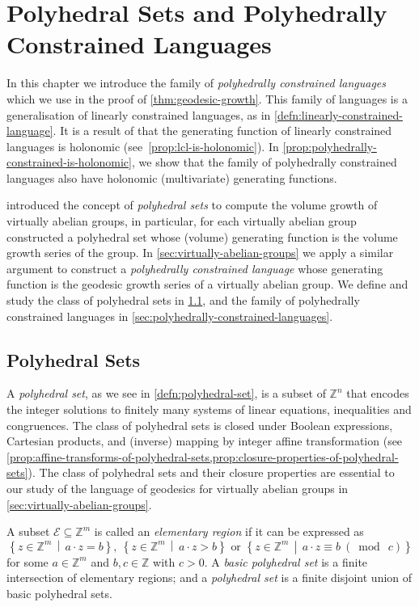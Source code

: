 \chapter{Polyhedral Sets and Polyhedrally Constrained Languages}\label{chp:polyhedral}

In this chapter we introduce the family of \emph{polyhedrally constrained languages} which we use in the proof of \cref{thm:geodesic-growth}.
This family of languages is a generalisation of linearly constrained languages, as in \cref{defn:linearly-constrained-language}.
It is a result of \textcite{massazza1993} that the generating function of linearly constrained languages is holonomic (see~\cref{prop:lcl-is-holonomic}).
In \cref{prop:polyhedrally-constrained-is-holonomic}, we show that the family of polyhedrally constrained languages also have holonomic (multivariate) generating functions.

\Textcite{benson1983} introduced the concept of \emph{polyhedral sets} to compute the volume growth of virtually abelian groups, in particular, for each virtually abelian group \citeauthor{benson1983} constructed a polyhedral set whose (volume) generating function is the volume growth series of the group.
In \cref{sec:virtually-abelian-groups} we apply a similar argument to construct a \emph{polyhedrally constrained language} whose generating function is the geodesic growth series of a virtually abelian group.
We define and study the class of polyhedral sets in \cref{sec:polyhedral-sets}, and the family of polyhedrally constrained languages in \cref{sec:polyhedrally-constrained-languages}.

\section{Polyhedral Sets}\label{sec:polyhedral-sets}

A \emph{polyhedral set}, as we see in \cref{defn:polyhedral-set}, is a subset of $\mathbb{Z}^n$ that encodes the integer solutions to finitely many systems of linear equations, inequalities and congruences.
The class of polyhedral sets is closed under Boolean expressions, Cartesian products, and (inverse) mapping by integer affine transformation (see \cref{prop:affine-transforms-of-polyhedral-sets,prop:closure-properties-of-polyhedral-sets}).
The class of polyhedral sets and their closure properties are essential to our study of the language of geodesics for virtually abelian groups in \cref{sec:virtually-abelian-groups}.

\begin{definition}\label{defn:polyhedral-set}
A subset $\mathcal{E} \subseteq \mathbb{Z}^m$ is called an \emph{elementary region} if it can be expressed as
\[
	\left\{
		z \in \mathbb{Z}^m
	\, \middle\vert \,
		a\cdot z = b
	\right\},
	\ 
	\left\{
		z \in \mathbb{Z}^m
	\, \middle\vert \,
		a\cdot z > b
	\right\}
	\text{ or } 
	\left\{
		z \in \mathbb{Z}^m
	\, \middle\vert \,
		a\cdot z \equiv b\ (\bmod\ c)
	\right\}
\]
for some $a \in \mathbb{Z}^m$ and $b,c\in \mathbb{Z}$ with $c > 0$.
A \emph{basic polyhedral set} is a finite intersection of elementary regions;
and a \emph{polyhedral set} is a finite disjoint union of basic polyhedral sets.
\end{definition}

